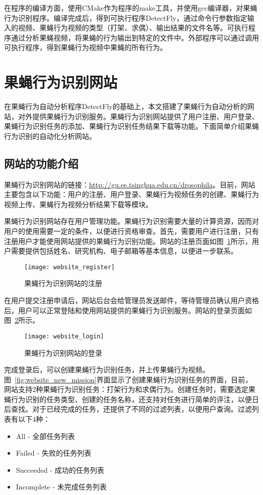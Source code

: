 在程序的编译方面，使用CMake作为程序的make工具，并使用gcc编译器，对果蝇行为识别程序。编译完成后，得到可执行程序DetectFly，通过命令行参数指定输入的视频、果蝇行为视频的类型（打架、求偶）、输出结果的文件名等。可执行程序通过分析果蝇视频，将果蝇的行为输出到特定的文件中。外部程序可以通过调用可执行程序，得到果蝇行为视频中果蝇的所有行为。

\section{果蝇行为识别网站}

在果蝇行为自动分析程序DetectFly的基础上，本文搭建了果蝇行为自动分析的网站，对外提供果蝇行为识别服务。果蝇行为识别网站提供了用户注册、用户登录、果蝇行为识别任务的添加、果蝇行为识别任务结果下载等功能。下面简单介绍果蝇行为识别的自动化分析网站。

\subsection{网站的功能介绍}

果蝇行为识别网站的链接：\url{http://gu.ee.tsinghua.edu.cn/drosophila}。目前，网站主要包含以下功能：用户的注册、用户登录、果蝇行为视频任务的创建、果蝇行为视频上传、果蝇行为视频分析结果下载等模块。

果蝇行为识别网站存在用户管理功能。果蝇行为识别需要大量的计算资源，因而对用户的使用需要一定的条件，以便进行资格审查。首先，需要用户进行注册，只有注册用户才能使用网站提供的果蝇行为识别功能。网站的注册页面如图~\ref{fig:website_register}所示，用户需要提供包括姓名、研究机构、电子邮箱等基本信息，以便进一步联系。

\begin{figure}
\centering
\texttt{[image: website\_register]}
\caption{果蝇行为识别网站的注册}
\label{fig:website_register}
\end{figure}

在用户提交注册申请后，网站后台会给管理员发送邮件，等待管理员确认用户资格后，用户可以正常登陆和使用网站提供的果蝇行为识别服务。网站的登录页面如图~\ref{fig:website_login}所示。

\begin{figure}
\centering
\texttt{[image: website\_login]}
\caption{果蝇行为识别网站的登录}
\label{fig:website_login}
\end{figure}

完成登录后，可以创建果蝇行为识别任务，并上传果蝇行为视频。图~\ref{fig:website_new_mission}界面显示了创建果蝇行为识别任务的界面，目前，网站支持2种果蝇行为识别任务：打架行为和求偶行为。创建任务时，需要选定果蝇行为识别的任务类型、创建的任务名称，还支持对任务进行简单的评注，以便日后查找。对于已经完成的任务，还提供了不同的过滤列表，以便用户查询。过滤列表有以下4种：
\begin{itemize}
\item All - 全部任务列表
\item Failed - 失败的任务列表
\item Succeeded - 成功的任务列表
\item Incomplete - 未完成任务列表
\end{itemize}

